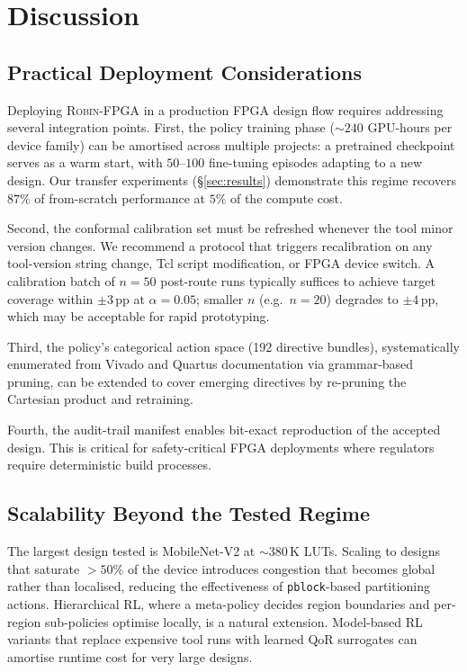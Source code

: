 \documentclass[journal]{IEEEtran}
\begin{document}
\section{Discussion}
\label{sec:discussion}

\subsection{Practical Deployment Considerations}

Deploying \textsc{Robin-FPGA} in a production FPGA design flow requires addressing several integration points. First, the policy training phase (${\sim}240$ GPU-hours per device family) can be amortised across multiple projects: a pretrained checkpoint serves as a warm start, with $50$--$100$ fine-tuning episodes adapting to a new design. Our transfer experiments (\S\ref{sec:results}) demonstrate this regime recovers $87\%$ of from-scratch performance at $5\%$ of the compute cost.

Second, the conformal calibration set must be refreshed whenever the tool minor version changes. We recommend a protocol that triggers recalibration on any tool-version string change, Tcl script modification, or FPGA device switch. A calibration batch of $n=50$ post-route runs typically suffices to achieve target coverage within $\pm 3$\,pp at $\alpha=0.05$; smaller $n$ (e.g.\ $n=20$) degrades to $\pm 4$\,pp, which may be acceptable for rapid prototyping.

Third, the policy's categorical action space (192 directive bundles), systematically enumerated from Vivado and Quartus documentation via grammar-based pruning, can be extended to cover emerging directives by re-pruning the Cartesian product and retraining.

Fourth, the audit-trail manifest enables bit-exact reproduction of the accepted design. This is critical for safety-critical FPGA deployments where regulators require deterministic build processes.

\subsection{Scalability Beyond the Tested Regime}

The largest design tested is MobileNet-V2 at ${\sim}380$\,K LUTs. Scaling to designs that saturate $>50\%$ of the device introduces congestion that becomes global rather than localised, reducing the effectiveness of \texttt{pblock}-based partitioning actions. Hierarchical RL, where a meta-policy decides region boundaries and per-region sub-policies optimise locally, is a natural extension. Model-based RL variants that replace expensive tool runs with learned QoR surrogates can amortise runtime cost for very large designs.
\end{document}
